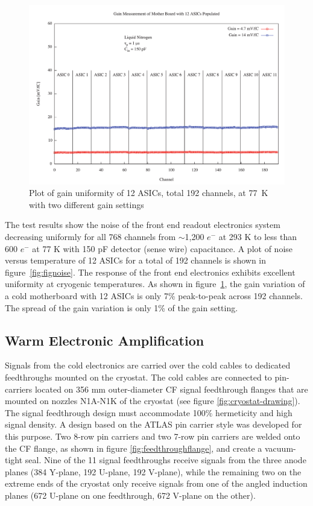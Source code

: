 \begin{figure}[hbt]
\begin{center}
\includegraphics[scale=0.4]{figures/gain.pdf}
\end{center}
\caption{\label{fig:figgain}Plot of gain uniformity of 12 ASICs, total 192 channels, at 77~K with two different gain settings}
\end{figure}

The test results show the noise of the front end readout electronics system decreasing uniformly for all 768 channels from $\sim$1,200 $e^{-}$ at 293 K to less than 600 $e^{-}$ at 77 K with 150 pF detector (sense wire) capacitance. A plot of noise versus temperature of 12 ASICs for a total of 192 channels is shown in figure~\ref{fig:fignoise}. The response of the front end electronics exhibits excellent uniformity at cryogenic temperatures. As shown in figure~\ref{fig:figgain}, the gain variation of a cold motherboard with 12 ASICs is only 7\% peak-to-peak across 192 channels. The spread of the gain variation is only 1\% of the gain setting.

\subsection{Warm Electronic Amplification}
\label{sec:warmelectronics}
Signals from the cold electronics are carried over the cold cables to dedicated feedthroughs mounted on the cryostat.  The cold cables are connected to pin-carriers located on 356 mm outer-diameter CF signal feedthrough flanges that are mounted on nozzles N1A-N1K of the cryostat (see figure \ref{fig:cryostat-drawing}).  The signal feedthrough design must accommodate 100$\%$ hermeticity and high signal density. A design based on the ATLAS pin carrier style was developed for this purpose.  Two 8-row pin carriers and two 7-row pin carriers are welded onto the CF flange, as shown in figure \ref{fig:feedthroughflange}, and create a vacuum-tight seal.  Nine of the 11 signal feedthroughs receive signals from the three \lartpc anode planes (384 Y-plane, 192 U-plane, 192 V-plane), while the remaining two on the extreme ends of the cryostat only receive signals from one of the angled induction planes (672 U-plane on one feedthrough, 672 V-plane on the other).

